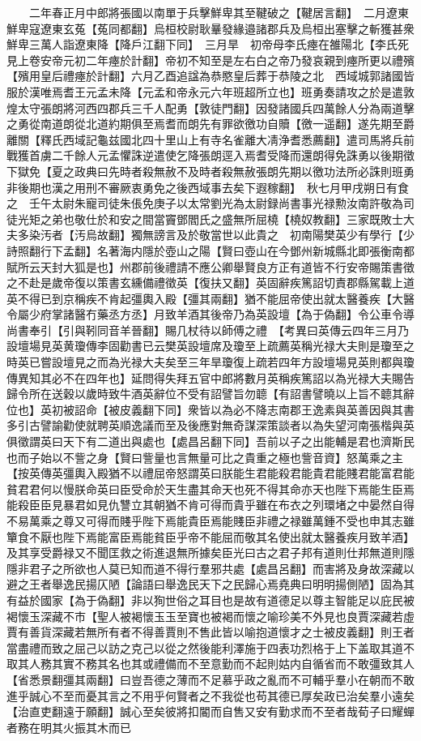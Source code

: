 　　二年春正月中郎將張國以南單于兵擊鮮卑其至鞬破之【鞬居言翻】　二月遼東鮮卑寇遼東玄菟【菟同都翻】烏桓校尉耿曅發緣邉諸郡兵及烏桓出塞擊之斬獲甚衆鮮卑三萬人詣遼東降【降戶江翻下同】　三月旱　初帝母李氏瘞在雒陽北【李氏死見上卷安帝元初二年瘞於計翻】帝初不知至是左右白之帝乃發哀親到瘞所更以禮殯【殯用皇后禮瘞於計翻】六月乙酉追諡為恭愍皇后葬于恭陵之北　西域城郭諸國皆服於漢唯焉耆王元孟未降【元孟和帝永元六年班超所立也】班勇奏請攻之於是遣敦煌太守張朗將河西四郡兵三千人配勇【敦徒門翻】因發諸國兵四萬餘人分為兩道擊之勇從南道朗從北道約期俱至焉耆而朗先有罪欲徼功自贖【徼一遥翻】遂先期至爵離關【釋氏西域記龜兹國北四十里山上有寺名雀離大凊浄耆悉薦翻】遣司馬將兵前戰獲首虜二千餘人元孟懼誅逆遣使乞降張朗逕入焉耆受降而還朗得免誅勇以後期徵下獄免【夏之政典曰先時者殺無赦不及時者殺無赦張朗先期以徼功法所必誅則班勇非後期也漢之用刑不審厥衷勇免之後西域事去矣下遐稼翻】　秋七月甲戌朔日有食之　壬午太尉朱寵司徒朱倀免庚子以太常劉光為太尉録尚書事光禄勲汝南許敬為司徒光矩之弟也敬仕於和安之間當竇鄧閻氏之盛無所屈橈【橈奴教翻】三家既敗士大夫多染汚者【汚烏故翻】獨無謗言及於敬當世以此貴之　初南陽樊英少有學行【少詩照翻行下孟翻】名著海内隱於壺山之陽【賢曰壺山在今鄧州新城縣北即張衡南都賦所云天封大狐是也】州郡前後禮請不應公卿舉賢良方正有道皆不行安帝賜策書徵之不赴是歲帝復以策書玄纁備禮徵英【復扶又翻】英固辭疾篤詔切責郡縣駕載上道英不得已到京稱疾不肯起彊輿入殿【彊其兩翻】猶不能屈帝使出就太醫養疾【大醫令屬少府掌諸醫冇藥丞方丞】月致羊酒其後帝乃為英設壇【為于偽翻】令公車令導尚書奉引【引與靷同音羊晉翻】賜几杖待以師傅之禮　【考異曰英傳云四年三月乃設壇場見英黄瓊傳李固勸書已云樊英設壇席及瓊至上疏薦英稱光禄大夫則是瓊至之時英已嘗設壇見之而為光禄大夫矣至三年旱瓊復上疏若四年方設壇場見英則都與瓊傳異知其必不在四年也】延問得失拜五官中郎將數月英稱疾篤詔以為光禄大夫賜告歸令所在送穀以歲時致牛酒英辭位不受有詔譬旨勿聼【有詔書譬曉以上旨不聼其辭位也】英初被詔命【被皮義翻下同】衆皆以為必不降志南郡王逸素與英善因與其書多引古譬諭勸使就聘英順逸議而至及後應對無奇謀深策談者以為失望河南張楷與英俱徵謂英曰天下有二道出與處也【處昌呂翻下同】吾前以子之出能輔是君也濟斯民也而子始以不訾之身【賢曰訾量也言無量可比之貴重之極也訾音資】怒萬乘之主【按英傳英彊輿入殿猶不以禮屈帝怒謂英曰朕能生君能殺君能貴君能賤君能富君能貧君君何以慢朕命英曰臣受命於天生盡其命天也死不得其命亦天也陛下焉能生臣焉能殺臣臣見暴君如見仇讐立其朝猶不肯可得而貴乎雖在布衣之列環堵之中晏然自得不易萬乘之尊又可得而賤乎陛下焉能貴臣焉能賤臣非禮之禄雖萬鍾不受也申其志雖簞食不厭也陛下焉能富臣焉能貧臣乎帝不能屈而敬其名使出就太醫養疾月致羊酒】及其享受爵禄又不聞匡救之術進退無所據矣臣光曰古之君子邦有道則仕邦無道則隱隱非君子之所欲也人莫已知而道不得行羣邪共處【處昌呂翻】而害將及身故深藏以避之王者舉逸民揚仄陋【論語曰舉逸民天下之民歸心焉堯典曰明明揚側陋】固為其有益於國家【為于偽翻】非以狥世俗之耳目也是故有道德足以尊主智能足以庇民被褐懷玉深藏不市【聖人被褐懷玉玉至寶也被褐而懷之喻珍美不外見也良賈深藏若虛賈有善貨深藏若無所有者不得善賈則不售此皆以喻抱道懷才之士被皮義翻】則王者當盡禮而致之屈己以訪之克己以從之然後能利澤施于四表功烈格于上下盖取其道不取其人務其實不務其名也其或禮備而不至意勤而不起則姑内自循省而不敢彊致其人【省悉景翻彊其兩翻】曰豈吾德之薄而不足慕乎政之亂而不可輔乎羣小在朝而不敢進乎誠心不至而憂其言之不用乎何賢者之不我從也苟其德已厚矣政已治矣羣小遠矣【治直吏翻遠于願翻】誠心至矣彼將扣閽而自售又安有勤求而不至者哉荀子曰耀蟬者務在明其火振其木而已